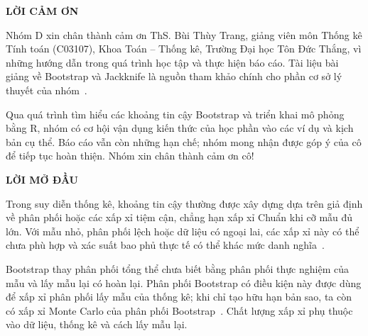 \documentclass[12pt,a4paper]{article}
\theoremstyle{definition}
\numberwithin{equation}{section}
\begin{document}
	\newpage


	\begin{center}
		{\Large\bfseries LỜI CẢM ƠN}
	\end{center}

	\vspace{0.5cm}
	Nhóm D xin chân thành cảm ơn ThS. Bùi Thùy Trang, giảng viên môn Thống kê Tính toán (C03107), Khoa Toán – Thống kê, Trường Đại học Tôn Đức Thắng, vì những hướng dẫn trong quá trình học tập và thực hiện báo cáo. Tài liệu bài giảng về Bootstrap và Jackknife là nguồn tham khảo chính cho phần cơ sở lý thuyết của nhóm~\cite{buithuytrang2026,rizzo2019}.

Qua quá trình tìm hiểu các khoảng tin cậy Bootstrap và triển khai mô phỏng bằng R, nhóm có cơ hội vận dụng kiến thức của học phần vào các ví dụ và kịch bản cụ thể. Báo cáo vẫn còn những hạn chế; nhóm mong nhận được góp ý của cô để tiếp tục hoàn thiện. Nhóm xin chân thành cảm ơn cô!

	\newpage


	\begin{center}
		{\Large\bfseries LỜI MỞ ĐẦU}
	\end{center}

	\vspace{0.5cm}
	Trong suy diễn thống kê, khoảng tin cậy thường được xây dựng dựa trên giả định về phân phối hoặc các xấp xỉ tiệm cận, chẳng hạn xấp xỉ Chuẩn khi cỡ mẫu đủ lớn. Với mẫu nhỏ, phân phối lệch hoặc dữ liệu có ngoại lai, các xấp xỉ này có thể chưa phù hợp và xác suất bao phủ thực tế có thể khác mức danh nghĩa~\cite{buithuytrang2026,rizzo2019,efron1993,davison1997}.

Bootstrap thay phân phối tổng thể chưa biết bằng phân phối thực nghiệm của mẫu và lấy mẫu lại có hoàn lại. Phân phối Bootstrap có điều kiện này được dùng để xấp xỉ phân phối lấy mẫu của thống kê; khi chỉ tạo hữu hạn bản sao, ta còn có xấp xỉ Monte Carlo của phân phối Bootstrap~\cite{efron1979,efron1993}. Chất lượng xấp xỉ phụ thuộc vào dữ liệu, thống kê và cách lấy mẫu lại.
\end{document}
